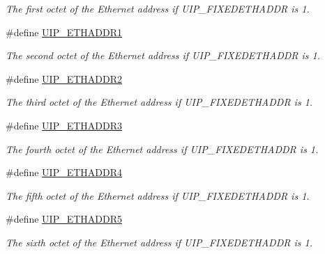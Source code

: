 \begin{CompactItemize}
\begin{CompactList}\small\item\em The first octet of the Ethernet address if UIP\_\-FIXEDETHADDR is 1. \item\end{CompactList}\item 
\hypertarget{a00071_gf3f291bfc1b7ecfc6029efe5f3a6f612}{
\#define \hyperlink{a00071_gf3f291bfc1b7ecfc6029efe5f3a6f612}{UIP\_\-ETHADDR1}}
\label{a00071_gf3f291bfc1b7ecfc6029efe5f3a6f612}

\begin{CompactList}\small\item\em The second octet of the Ethernet address if UIP\_\-FIXEDETHADDR is 1. \item\end{CompactList}\item 
\hypertarget{a00071_g061010ab6c76e03cc1bfb5ba6d4b8a73}{
\#define \hyperlink{a00071_g061010ab6c76e03cc1bfb5ba6d4b8a73}{UIP\_\-ETHADDR2}}
\label{a00071_g061010ab6c76e03cc1bfb5ba6d4b8a73}

\begin{CompactList}\small\item\em The third octet of the Ethernet address if UIP\_\-FIXEDETHADDR is 1. \item\end{CompactList}\item 
\hypertarget{a00071_g0a44b1ff94c0adf3d6e46d139ce07476}{
\#define \hyperlink{a00071_g0a44b1ff94c0adf3d6e46d139ce07476}{UIP\_\-ETHADDR3}}
\label{a00071_g0a44b1ff94c0adf3d6e46d139ce07476}

\begin{CompactList}\small\item\em The fourth octet of the Ethernet address if UIP\_\-FIXEDETHADDR is 1. \item\end{CompactList}\item 
\hypertarget{a00071_gb79c04002ae9a43d2801594e11273ea3}{
\#define \hyperlink{a00071_gb79c04002ae9a43d2801594e11273ea3}{UIP\_\-ETHADDR4}}
\label{a00071_gb79c04002ae9a43d2801594e11273ea3}

\begin{CompactList}\small\item\em The fifth octet of the Ethernet address if UIP\_\-FIXEDETHADDR is 1. \item\end{CompactList}\item 
\hypertarget{a00071_g96cd1f904e357ab0510dd6a2b27ea8c8}{
\#define \hyperlink{a00071_g96cd1f904e357ab0510dd6a2b27ea8c8}{UIP\_\-ETHADDR5}}
\label{a00071_g96cd1f904e357ab0510dd6a2b27ea8c8}

\begin{CompactList}\small\item\em The sixth octet of the Ethernet address if UIP\_\-FIXEDETHADDR is 1. \item\end{CompactList}\end{CompactItemize}


